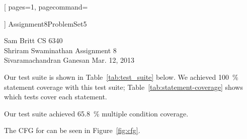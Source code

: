 \documentclass{article}
\newcommand\codefamily{\ttfamily}  %
\newcommand\code[1]{\text{\codefamily #1}}
\begin{document}
\thispagestyle{empty}


  [
    pages=1,
    pagecommand=
      {
      }
  ]
  {Assignment8ProblemSet5}

\clearpage
{}

\noindent
Sam Britt                \hfill CS 6340      \\
Shriram Swaminathan      \hfill Assignment 8 \\
Sivaramachandran Ganesan \hfill Mar. 12, 2013

Our test suite is shown in Table~\ref{tab:test_suite} below. We
achieved \SI{100}{\percent} statement coverage with this test suite;
Table~\ref{tab:statement-coverage} shows which tests cover each
statement.

Our test suite achieved \SI{65.8}{\percent} multiple condition
coverage.

The CFG for \code{tritype.c} can be seen in Figure~\ref{fig:cfg}.
\end{document}
